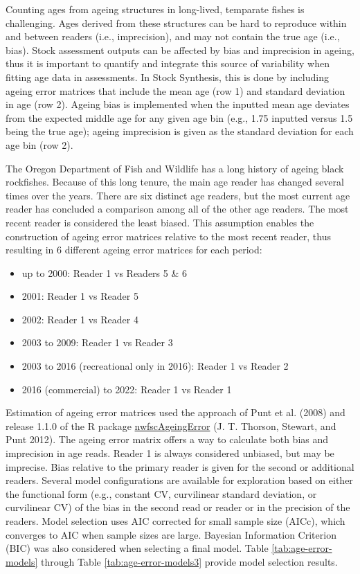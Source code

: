 \documentclass[11pt,
  english,
  letterpaper,
]{article}
\providecommand{\tightlist}{%
  \setlength{\itemsep}{0pt}\setlength{\parskip}{0pt}}
\providecommand{\tightlist}{%
  \setlength{\itemsep}{0pt}\setlength{\parskip}{0pt}}
\begin{document}
Counting ages from ageing structures in long-lived, temparate fishes is challenging. Ages derived from these structures can be hard to reproduce within and between readers (i.e., imprecision), and may not contain the true age (i.e., bias). Stock assessment outputs can be affected by bias and imprecision in ageing, thus it is important to quantify and integrate this source of variability when fitting age data in assessments. In Stock Synthesis, this is done by including ageing error matrices that include the mean age (row 1) and standard deviation in age (row 2). Ageing bias is implemented when the inputted mean age deviates from the expected middle age for any given age bin (e.g., 1.75 inputted versus 1.5 being the true age); ageing imprecision is given as the standard deviation for each age bin (row 2).

The Oregon Department of Fish and Wildlife has a long history of ageing black rockfishes. Because of this long tenure, the main age reader has changed several times over the years. There are six distinct age readers, but the most current age reader has concluded a comparison among all of the other age readers. The most recent reader is considered the least biased. This assumption enables the construction of ageing error matrices relative to the most recent reader, thus resulting in 6 different ageing error matrices for each period:

\begin{itemize}
\tightlist
\item
  up to 2000: Reader 1 vs Readers 5 \& 6
\item
  2001: Reader 1 vs Reader 5
\item
  2002: Reader 1 vs Reader 4
\item
  2003 to 2009: Reader 1 vs Reader 3
\item
  2003 to 2016 (recreational only in 2016): Reader 1 vs Reader 2
\item
  2016 (commercial) to 2022: Reader 1 vs Reader 1
\end{itemize}

Estimation of ageing error matrices used the approach of Punt et al. (2008) and release 1.1.0 of the R package \href{https://github.com/nwfsc-assess/nwfscAgeingError}{nwfscAgeingError} (J. T. Thorson, Stewart, and Punt 2012). The ageing error matrix offers a way to calculate both bias and imprecision in age reads. Reader 1 is always considered unbiased, but may be imprecise. Bias relative to the primary reader is given for the second or additional readers. Several model configurations are available for exploration based on either the functional form (e.g., constant CV, curvilinear standard deviation, or curvilinear CV) of the bias in the second read or reader or in the precision of the readers. Model selection uses AIC corrected for small sample size (AICc), which converges to AIC when sample sizes are large. Bayesian Information Criterion (BIC) was also considered when selecting a final model. Table \ref{tab:age-error-models} through Table \ref{tab:age-error-models3} provide model selection results.
\end{document}
